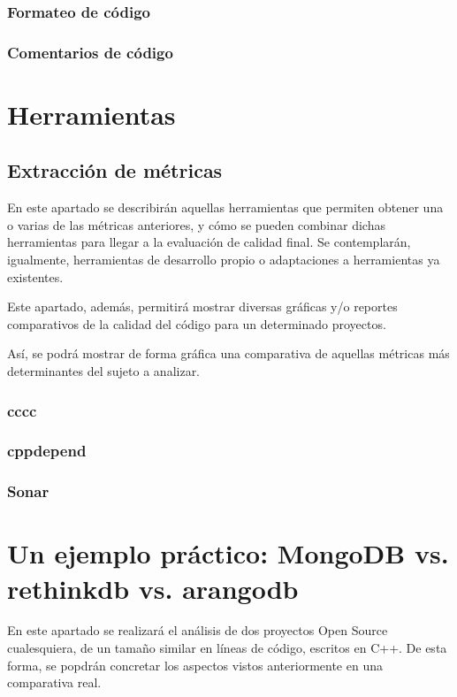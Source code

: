 \documentclass[11pt]{article}
\begin{document}
\subsubsection{Formateo de código}
\subsubsection{Comentarios de código}

\section{Herramientas}

\subsection{Extracción de métricas}
En este apartado se describirán aquellas herramientas que permiten obtener una o varias de las métricas anteriores, y cómo se pueden combinar dichas herramientas para llegar a la evaluación de calidad final. Se contemplarán, igualmente, herramientas de desarrollo propio o adaptaciones a herramientas ya existentes.

Este apartado, además, permitirá mostrar diversas gráficas y/o reportes comparativos de la calidad del código para un determinado proyectos.

Así, se podrá mostrar de forma gráfica una comparativa de aquellas métricas más determinantes del sujeto a analizar.

\subsubsection{cccc}

\subsubsection{cppdepend}

\subsubsection{Sonar}

\section{Un ejemplo práctico: MongoDB vs. rethinkdb vs. arangodb}

En este apartado se realizará el análisis de dos proyectos Open Source cualesquiera, de un tamaño similar en líneas de código, escritos en C++. De esta forma, se popdrán concretar los aspectos vistos anteriormente en una comparativa real.
\end{document}
